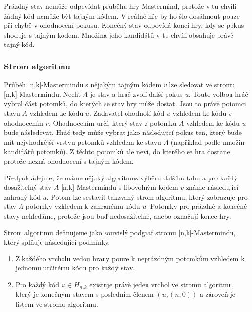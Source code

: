Prázdný stav nemůže odpovídat průběhu hry Mastermind, protože v tu chvíli žádný kód nemůže být tajným kódem. V reálné hře by ho šlo dosáhnout pouze při chybě v ohodnocení pokusu. Konečný stav odpovídá konci hry, kdy se pokus shoduje s tajným kódem. Množina jeho kandidátů v tu chvíli obsahuje právě tajný kód. 

\subsubsection{Strom algoritmu}
Průběh [n,k]-Mastermindu s nějakým tajným kódem $v$ lze sledovat ve stromu [n,k]-Mastermindu. Nechť $A$ je stav a hráč zvolí další pokus $u$. Touto volbou hráč vybral část potomků, do kterých se stav hry může dostat. Jsou to právě potomci stavu $A$ vzhledem ke kódu $u$. Zadavatel ohodnotí kód $u$ vzhledem ke kódu $v$ ohodnocením $r$. Ohodnocením určí, který stav z potomků $A$ vzhledem ke kódu $u$ bude následovat. Hráč tedy může vybrat jako následující pokus ten, který bude mít nejvhodnější vrstvu potomků vzhledem ke stavu $A$ (například podle množin kandidátů potomků). Z těchto potomků ale neví, do kterého se hra dostane, protože nezná ohodnocení s tajným kódem. 

Předpokládejme, že máme nějaký algoritmus výběru dalšího tahu a pro každý dosažitelný stav $A$ [n,k]-Mastermindu s libovolným kódem $v$ známe následující zahraný kód $u$. Potom lze sestavit takzvaný strom algoritmu, který zobrazuje pro stav $A$ potomky vzhledem k zahranému kódu $u$. Potomky pro prázdné a konečné stavy nehledáme, protože jsou buď nedosažitelné, anebo označují konec hry. 

\begin{definice}
  Strom algoritmu definujeme jako souvislý podgraf stromu [n,k]-Mastermindu, který splňuje následující podmínky.
  \begin{enumerate}
      \item Z každého vrcholu vedou hrany pouze k neprázdným potomkům vzhledem k jednomu určitému kódu pro každý stav. 
      \item Pro každý kód $u \in H_{n,k}$ existuje právě jeden vrchol ve stromu algoritmu, který je konečným stavem s posledním členem $(u, (n,0))$ a zároveň je listem ve stromu algoritmu. 
      
  \end{enumerate}
\end{definice}

